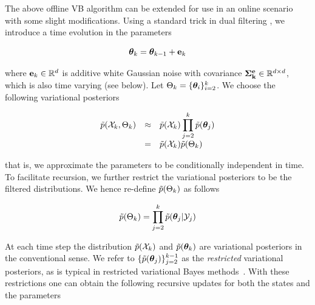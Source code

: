 \documentclass{article}
\begin{document}

The above offline VB algorithm can be extended for use in an online scenario with some slight
modifications. Using a standard trick in dual filtering \cite{Haykin_2001}, we introduce a time
evolution in the parameters

\begin{equation}\label{eq:thetaevolve} \thetabk = \thetabkk + \ek \end{equation}

\noindent where ${\bf e}_k \in \mathbb{R}^d$ is additive white Gaussian noise with covariance ${\bf \Sigma^{e}_{k}} \in
\mathbb{R}^{d\times d}$, which is also time varying (see below). Let $\Theta_k = \{{\bm \theta}_i\}_{i=2}^{k}$.
We choose the following variational posteriors

\begin{equation} \begin{array}{rcl} \tilde{p}(\mathcal{X}_k,\Theta_k) &\approx& \tilde{p}(\mathcal{X}_k) \displaystyle \prod_{j=2}^k
	\tilde{p}({\bm \theta}_{j}) \\[1ex] &=& \tilde{p}(\mathcal{X}_k)\tilde{p}(\Theta_k) \\ \end{array} \end{equation}

\noindent that is, we approximate the parameters to be conditionally independent in time. To
facilitate recursion, we further restrict the variational posteriors to be the filtered
distributions. We hence re-define $\tilde{p}(\Theta_k)$ as follows

\begin{equation}\label{eq:restriction} \pt(\Theta_k) = \displaystyle \prod_{j=2}^k
	\pt(\thetab_{j}|\Y_j) \end{equation}

At each time step the distribution $\tilde{p}(\mathcal{X}_k)$ and $\tilde{p}({\bm \theta}_{k})$ are variational posteriors in
the conventional sense. We refer to $\{\tilde{p}({\bm \theta}_{j})\}_{j=2}^{k-1}$ as the \emph{restricted}
variational posteriors, as is typical in restricted variational Bayes methods~\cite{Smidl_2006b}.
With these restrictions one can obtain the following recursive updates for both the states and the
parameters
\end{document}
